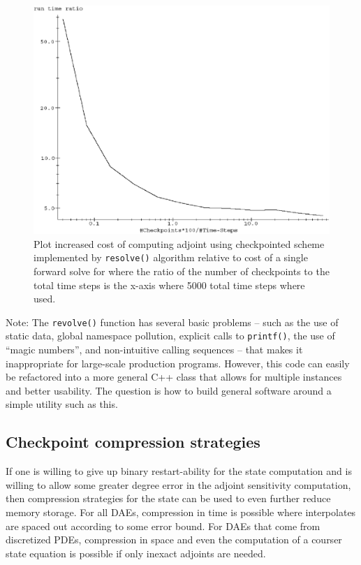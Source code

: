\documentclass[pdf,ps2pdf,11pt]{SANDreport}
\begin{document}
{\bsinglespace
\begin{figure}
\begin{center}
\includegraphics*[scale=0.75]{checkpoint_graph}
\end{center}
\caption{
\label{rythmos:fig:checkpoint_graph}
Plot increased cost of computing adjoint using checkpointed scheme implemented
by {}\texttt{resolve()} algorithm relative to cost of a single forward solve
for where the ratio of the number of checkpoints to the total time steps is
the x-axis where 5000 total time steps where used.  }
\end{figure}
\esinglespace}

Note: The {}\texttt{revolve()} function has several basic problems -- such as
the use of static data, global namespace pollution, explicit calls to
{}\texttt{printf()}, the use of ``magic numbers'', and non-intuitive calling
sequences -- that makes it inappropriate for large-scale production programs.
However, this code can easily be refactored into a more general C++ class that
allows for multiple instances and better usability.  The question is how to
build general software around a simple utility such as this.

\subsection{Checkpoint compression strategies}

If one is willing to give up binary restart-ability for the state computation
and is willing to allow some greater degree error in the adjoint sensitivity
computation, then compression strategies for the state can be used to even
further reduce memory storage.  For all DAEs, compression in time is possible
where interpolates are spaced out according to some error bound.  For DAEs
that come from discretized PDEs, compression in space and even the
computation of a courser state equation is possible if only inexact
adjoints are needed.
\end{document}

